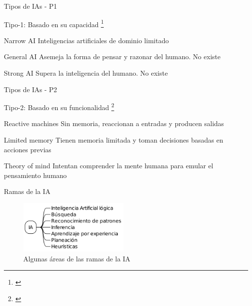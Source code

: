 \documentclass[aspectratio=169, 9pt]{beamer}
\begin{document}
\begin{frame}[label={sec:org0122229}]{Tipos de IAs - P1}
\begin{block}{Tipo-1: Basado en su capacidad \footnote{\autocite{Jones_2009}}}
\begin{block}{Narrow AI}
Inteligencias artificiales de dominio limitado
\end{block}

\begin{block}{General AI}
Asemeja la forma de pensar y razonar del humano. No existe
\end{block}

\begin{block}{Strong AI}
Supera la inteligencia del humano. No existe
\end{block}
\end{block}
\end{frame}

\begin{frame}[label={sec:orgcf4bb3e}]{Tipos de IAs - P2}
\begin{block}{Tipo-2: Basado en su funcionalidad \footnote{\autocite{Jones_2009}}}
\begin{block}{Reactive machines}
Sin memoria, reaccionan a entradas y producen salidas
\end{block}

\begin{block}{Limited memory}
Tienen memoria limitada y toman decisiones basadas en acciones previas
\end{block}

\begin{block}{Theory of mind}
Intentan comprender la mente humana para emular el pensamiento humano
\end{block}
\end{block}
\end{frame}

\begin{frame}[label={sec:orgc9e4388}]{Ramas de la IA}
\begin{figure}[htbp]
\centering
\includegraphics[height=100px]{./images/mp.png}
\caption{Algunas áreas de las ramas de la IA}
\end{figure}
\end{frame}
\end{document}
